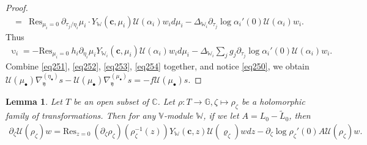 \documentclass[12pt,a4paper,notitlepage]{report}
\theoremstyle{definition}
\theoremstyle{plain}
\newtheorem{lm}[df]{Lemma}
\newcommand{\mc}{\mathcal}
\newcommand{\wtd}{\widetilde}
\newcommand{\Res}{\mathrm{Res}}
\newcommand{\yk}{\mathfrak y}
\newcommand{\blt}{\bullet}
\newcommand{\Vbb}{\mathbb V}
\newcommand{\Wbb}{\mathbb W}
\newcommand{\Gbb}{\mathbb G}
\newcommand{\Cbb}{\mathbb C}
\newcommand{\cbf}{\mathbf c}
\numberwithin{equation}{section}
\begin{document}
\begin{proof}
\begin{align*}
=&\Res_{\mu_i=0}~\partial_{\tau_j/\eta_i}\mu_i\cdot Y_\Wbb(\cbf,\mu_i) \mc U(\alpha_i)w_i d\mu_i-\Delta_{\Wbb_i}\partial_{\tau_j}\log\alpha_i'(0)\mc U(\alpha_i)w_i.
\end{align*}
Thus
\begin{align}
\upupsilon_i=-\Res_{\mu_i=0}~h_i\partial_{\eta_i}\mu_i Y_{\Wbb_i}(\cbf,\mu_i)\mc U(\alpha_i)w_id\mu_i-\Delta_{\Wbb_i}\sum_j g_j\partial_{\tau_j}\log\alpha_i'(0)\mc U(\alpha_i)w_i.\label{eq254}
\end{align}
Combine \eqref{eq251}, \eqref{eq252}, \eqref{eq253}, \eqref{eq254} together, and notice \eqref{eq250}, we obtain $\mc U(\mu_\blt)\nabla_\yk^{(\eta_\blt)}s-\mc U(\mu_\blt)\nabla_\yk^{(\mu_\blt)}s=-f\mc U(\mu_\blt)s$.
\end{proof}




\begin{lm}\label{lb141}
Let $T$ be an open subset of $\Cbb$. Let $\rho:T\rightarrow\Gbb,\zeta\mapsto\rho_\zeta$ be a holomorphic family of transformations. Then for any $\Vbb$-module $\Wbb$, if we let $A=L_0-\wtd L_0$, then
\begin{align}
\partial_\zeta\mc U(\rho_\zeta)w=\Res_{z=0}~(\partial_\zeta\rho_\zeta)(\rho_\zeta^{-1}(z)) Y_\Wbb(\cbf,z) \mc U(\varrho_\zeta)w dz-\partial_\zeta\log\rho_\zeta'(0)A\mc U(\rho_\zeta)w.
\end{align}
\end{lm}
\end{document}
